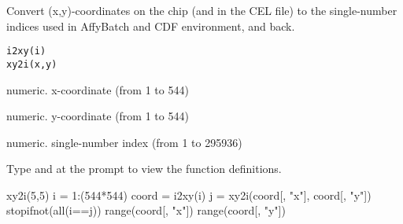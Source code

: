 \begin{Description}\relax
Convert (x,y)-coordinates on the chip (and in the CEL file) to the
single-number indices used in AffyBatch and CDF environment, and back.
\end{Description}
\begin{Usage}
\begin{verbatim}i2xy(i)
xy2i(x,y)
\end{verbatim}
\end{Usage}
\begin{Arguments}
\begin{ldescription}
\item[\code{x}] numeric. x-coordinate (from 1 to 544)
\item[\code{y}] numeric. y-coordinate (from 1 to 544)
\item[\code{i}] numeric. single-number index (from 1 to 295936)
\end{ldescription}
\end{Arguments}
\begin{Details}\relax
Type  and  at the \R{} prompt to 
view the function definitions.
\end{Details}
\begin{SeeAlso}\relax
{}
\end{SeeAlso}
\begin{Examples}
\begin{ExampleCode}
  xy2i(5,5)
  i     = 1:(544*544)
  coord = i2xy(i)
  j     = xy2i(coord[, "x"], coord[, "y"])
  stopifnot(all(i==j))
  range(coord[, "x"])
  range(coord[, "y"])
\end{ExampleCode}
\end{Examples}

